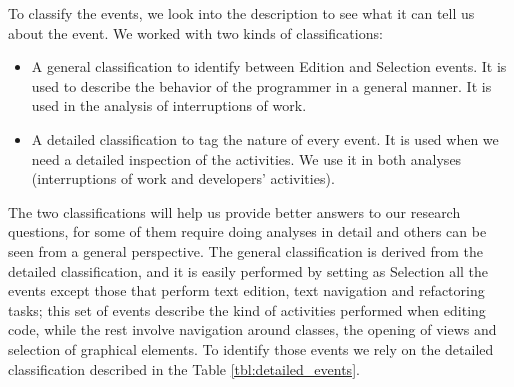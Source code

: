 \begin{changedforreviewerlong}
To classify the events, we look into the description to see what it can tell us about the event. We worked with two kinds of classifications:
\begin{itemize}
	\item A general classification to identify between Edition and Selection events. It is used to describe the behavior of the programmer in a general manner. It is used in the analysis of interruptions of work.
	\item A detailed classification to tag the nature of every event. It is used when we need a detailed inspection of the activities. We use it in both analyses (interruptions of work and developers' activities).
\end{itemize}

The two classifications will help us provide better answers to our research questions, for some of them require doing analyses in detail and others can be seen from a general perspective. The general classification is derived from the detailed classification, and it is easily performed by setting as Selection all the events except those that perform text edition, text navigation and refactoring tasks; this set of events describe the kind of activities performed when editing code, while the rest involve navigation around classes, the opening of views and selection of graphical elements. To identify those events we rely on the detailed classification described in the Table \ref{tbl:detailed_events}.

\end{changedforreviewerlong}

